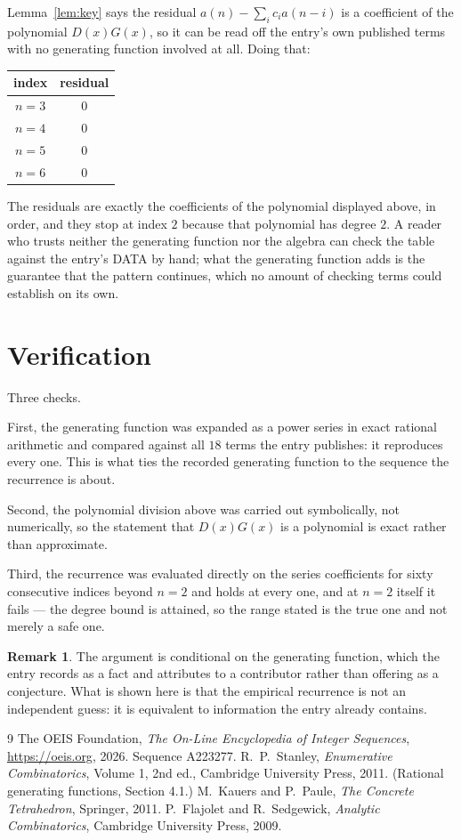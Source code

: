 \documentclass[11pt,a4paper]{article}
\theoremstyle{plain}
\theoremstyle{definition}
\newtheorem{remark}[theorem]{Remark}
\begin{document}
Lemma~\ref{lem:key} says the residual $a(n)-\sum_ic_ia(n-i)$ is a coefficient of the
polynomial $D(x)G(x)$, so it can be read off the entry's own published terms with no
generating function involved at all. Doing that:
\begin{center}
\begin{tabular}{cc}
index & residual \\ \hline
$n=3$ & $0$ \\
$n=4$ & $0$ \\
$n=5$ & $0$ \\
$n=6$ & $0$
\end{tabular}
\end{center}
The residuals are exactly the coefficients of the polynomial displayed above, in order, and
they stop at index $2$ because that polynomial has degree $2$. A reader who trusts
neither the generating function nor the algebra can check the table against the entry's DATA
by hand; what the generating function adds is the guarantee that the pattern continues, which
no amount of checking terms could establish on its own.

\section{Verification}

Three checks.

First, the generating function was expanded as a power series in exact rational arithmetic and
compared against all $18$ terms the entry publishes: it reproduces every one. This is
what ties the recorded generating function to the sequence the recurrence is about.

Second, the polynomial division above was carried out symbolically, not numerically, so the
statement that $D(x)G(x)$ is a polynomial is exact rather than approximate.

Third, the recurrence was evaluated directly on the series coefficients for sixty consecutive
indices beyond $n=2$ and holds at every one, and at $n=2$ itself it fails --- the
degree bound is attained, so the range stated is the true one and not merely a safe one.

\begin{remark}
The argument is conditional on the generating function, which the entry records as a fact and
attributes to a contributor rather than offering as a conjecture. What is shown here is that
the empirical recurrence is not an independent guess: it is equivalent to information the
entry already contains.
\end{remark}

\begin{thebibliography}{9}
 The OEIS Foundation, \emph{The On-Line Encyclopedia of Integer
Sequences}, \url{https://oeis.org}, 2026. Sequence A223277.
 R.~P.~Stanley, \emph{Enumerative Combinatorics}, Volume 1, 2nd ed.,
Cambridge University Press, 2011. (Rational generating functions, Section 4.1.)
 M.~Kauers and P.~Paule, \emph{The Concrete Tetrahedron}, Springer, 2011.
 P.~Flajolet and R.~Sedgewick, \emph{Analytic Combinatorics}, Cambridge
University Press, 2009.
\end{thebibliography}
\end{document}
